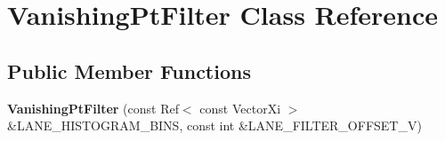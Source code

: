 \hypertarget{classVanishingPtFilter}{\section{Vanishing\-Pt\-Filter Class Reference}
\label{classVanishingPtFilter}
}
\subsection*{Public Member Functions}
\begin{DoxyCompactItemize}
\item 
\hypertarget{classVanishingPtFilter_a3ecfb92539e41bc01a16e9e71e917e48}{{\bfseries Vanishing\-Pt\-Filter} (const Ref$<$ const Vector\-Xi $>$ \&L\-A\-N\-E\-\_\-\-H\-I\-S\-T\-O\-G\-R\-A\-M\-\_\-\-B\-I\-N\-S, const int \&L\-A\-N\-E\-\_\-\-F\-I\-L\-T\-E\-R\-\_\-\-O\-F\-F\-S\-E\-T\-\_\-\-V)}\label{classVanishingPtFilter_a3ecfb92539e41bc01a16e9e71e917e48}

\end{DoxyCompactItemize}
